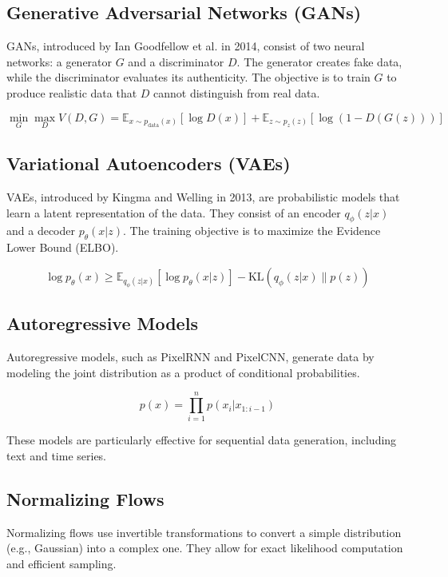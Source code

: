 \subsection{Generative Adversarial Networks (GANs)}
GANs, introduced by Ian Goodfellow et al. in 2014, consist of two neural networks: a generator \( G \) and a discriminator \( D \). The generator creates fake data, while the discriminator evaluates its authenticity. The objective is to train \( G \) to produce realistic data that \( D \) cannot distinguish from real data.

\begin{equation}
\min_G \max_D V(D, G) = \mathbb{E}_{x \sim p_{\text{data}}(x)}[\log D(x)] + \mathbb{E}_{z \sim p_z(z)}[\log(1 - D(G(z)))]
\end{equation}

\subsection{Variational Autoencoders (VAEs)}
VAEs, introduced by Kingma and Welling in 2013, are probabilistic models that learn a latent representation of the data. They consist of an encoder \( q_\phi(z|x) \) and a decoder \( p_\theta(x|z) \). The training objective is to maximize the Evidence Lower Bound (ELBO).

\begin{equation}
\log p_\theta(x) \geq \mathbb{E}_{q_\phi(z|x)}[\log p_\theta(x|z)] - \text{KL}(q_\phi(z|x) \| p(z))
\end{equation}

\subsection{Autoregressive Models}
Autoregressive models, such as PixelRNN and PixelCNN, generate data by modeling the joint distribution as a product of conditional probabilities.

\begin{equation}
p(x) = \prod_{i=1}^n p(x_i | x_{1:i-1})
\end{equation}

These models are particularly effective for sequential data generation, including text and time series.

\subsection{Normalizing Flows}
Normalizing flows use invertible transformations to convert a simple distribution (e.g., Gaussian) into a complex one. They allow for exact likelihood computation and efficient sampling.

